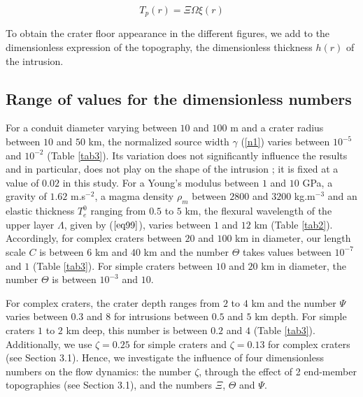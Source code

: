 \begin{article}
	\begin{equation}
          T_p(r)=\Xi\Omega\xi(r)
          \label{TopoFinal}
	\end{equation}
	
        To  obtain  the  crater  floor  appearance  in  the  different
        figures,  we  add  to  the  dimensionless  expression  of  the
        topography,   the  dimensionless   thickness  $h(r)$   of  the
        intrusion.
	 
	
        \subsection{Range of values for the dimensionless numbers}
        \label{Dimensionless_Number}
	 
        For a conduit diameter varying between  $10$ and $100$ m and a
        crater radius between $10$ and  $50$ km, the normalized source
        width  $\gamma$   (\ref{n1})  varies  between   $10^{-5}$  and
        $10^{-2}$   (Table  \ref{tab3}).   Its   variation  does   not
        significantly influence  the results  and in  particular, does
        not play on  the shape of the  intrusion \citep{Michaut2011} ;
        it is fixed at a value of  $0.02$ in this study. For a Young's
        modulus  between  $1$  and  $10$  GPa,  a  gravity  of  $1.62$
        m.s$^{-2}$, a magma density $\rho_m$ between $2800$ and $3200$
        kg.m$^{-3}$  and an  elastic  thickness  $T_e^0$ ranging  from
        $0.5$ to  $5$ km, the  flexural wavelength of the  upper layer
        $\Lambda$,  given by  ($\ref{eq99}$), varies  between $1$  and
        $12$ km  (Table \ref{tab2}). Accordingly, for  complex craters
        between $20$ and $100$ km in diameter, our length scale $C$ is
        between  $6$ km  and $40$  km  and the  number $\Theta$  takes
        values  between  $10^{-7}$  and $1$  (Table  \ref{tab3}).  For
        simple  craters between  $10$  and $20$  km  in diameter,  the
        number $\Theta$ is between $10^{-3}$ and $10$.
	 
        For complex craters,  the crater depth ranges from  $2$ to $4$
        km  and the  number $\Psi$  varies between  $0.3$ and  $8$ for
        intrusions between $0.5$ and $5$  km depth. For simple craters
        $1$  to $2$  km deep,  this number  is between  $0.2$ and  $4$
        (Table  \ref{tab3}).  Additionally,  we use  $\zeta=0.25$  for
        simple  craters  and  $\zeta=0.13$ for  complex  craters  (see
        Section  3.1). Hence,  we  investigate the  influence of  four
        dimensionless  numbers  on  the   flow  dynamics:  the  number
        $\zeta$, through the effect  of 2 end-member topographies (see
        Section 3.1), and the numbers $\Xi$, $\Theta$ and $\Psi$.
	

\end{article}
